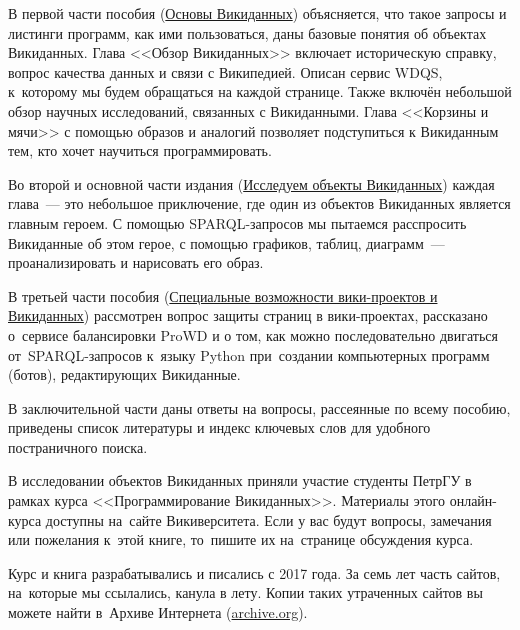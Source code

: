 В первой части пособия (\hyperref[part:foundation]{Основы Викиданных}) объясняется, 
что такое запросы и листинги программ, как ими пользоваться, даны базовые понятия об объектах Викиданных. 
Глава <<Обзор Викиданных>> включает историческую справку, 
вопрос качества данных и связи с Википедией. 
Описан сервис WDQS, к~которому мы будем обращаться на каждой странице. 
Также включён небольшой обзор научных исследований, связанных с Викиданными. 
Глава <<Корзины и мячи>> с помощью образов и аналогий позволяет подступиться к Викиданным тем, 
кто хочет научиться программировать. 


Во второй и основной части издания (\hyperref[part:research]{Исследуем объекты Викиданных}) каждая 
глава~--- это небольшое приключение, 
где один из объектов Викиданных является главным героем. 
С помощью SPARQL-запросов мы пытаемся расспросить Викиданные об этом герое, 
с помощью графиков, таблиц, диаграмм~--- проанализировать и нарисовать его образ. 



\newpage
В третьей части пособия (\hyperref[part:advanced]
                                  {Специальные возможности вики-проектов и Викиданных}) 
рассмотрен вопрос защиты страниц в вики-проектах, 
рассказано о~сервисе балансировки ProWD и о том, 
как можно последовательно двигаться от~SPARQL-запросов 
к~языку Python при~создании компьютерных программ (ботов), редактирующих Викиданные. 


В заключительной части 
даны ответы на вопросы, рассеянные по всему пособию, приведены список литературы 
и индекс ключевых слов для удобного постраничного поиска.

В исследовании объектов Викиданных приняли участие студенты ПетрГУ в рамках курса <<Программирование Викиданных>>. 
Материалы этого онлайн-курса доступны на~сайте Викиверситета. 
Если у вас будут вопросы, замечания или пожелания к~этой книге, 
то~пишите их на~странице обсуждения курса. 

Курс и книга разрабатывались и писались с 2017 года. 
За семь лет часть сайтов, на~которые мы ссылались, канула в лету. 
Копии таких утраченных сайтов вы можете найти в~Архиве Интернета (\href{https://archive.org/}{archive.org}).

